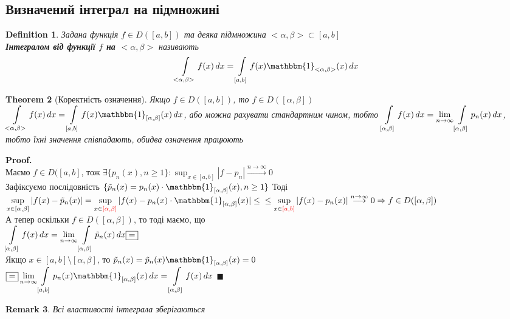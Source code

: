 \documentclass[a4paper, 14pt]{extarticle}
\def\huge{\displaystyle}
\def\bigline{\vspace{5mm}\\}
\theoremstyle{theoremdd}
\newtheorem{theorem}{Theorem}[subsection]
\theoremstyle{theoremdd}
\newtheorem{definition}[theorem]{Definition}
\theoremstyle{theoremdd}
\theoremstyle{theoremdd}
\theoremstyle{theoremdd}
\theoremstyle{theoremdd}
\newtheorem{remark}[theorem]{Remark}
\theoremstyle{theoremdd}
\theoremstyle{theoremdd}
\newenvironment{pf}{\vspace*{-3mm} \textbf{Proof. \\}}{$\blacksquare$}
\begin{document}
\subsection{Визначений інтеграл на підмножині}
\begin{definition}
Задана функція $f \in D([a,b])$ та деяка підмножина $<\alpha, \beta> \subset [a,b]$\\
\textbf{Інтегралом від функції $f$ на $<\alpha, \beta>$} називають
\begin{align*}
\int\displaylimits_{<\alpha, \beta>} f(x)\,dx = \int\displaylimits_{[a,b]} f(x) \mathbbm{1}_{<\alpha,\beta>}(x)\,dx
\end{align*}
\end{definition}

\begin{theorem}[Коректність означення]
Якщо $f \in D([a,b])$, то $f \in D([\alpha, \beta])$\\
$\huge \int\displaylimits_{<\alpha, \beta>} f(x)\,dx = \int\displaylimits_{[a,b]} f(x) \mathbbm{1}_{[\alpha,\beta]}(x)\,dx$, або можна рахувати стандартним чином, тобто $\huge \int\displaylimits_{[\alpha, \beta]} f(x)\,dx = \lim_{n \to \infty} \int\displaylimits_{[\alpha, \beta]} p_n(x)\,dx$, тобто їхні значення співпадають, обидва означення працюють
\end{theorem}

\begin{pf}
Маємо $f \in D([a,b]$, тож $\exists \{p_n(x), n \geq 1\}: \huge \sup_{x \in [a,b]} |f-p_n| \overset{n \to \infty}{\longrightarrow} 0$\\
Зафіксуємо послідовність $\{ \tilde{p}_n(x) = p_n(x) \cdot \mathbbm{1}_{[\alpha, \beta]}(x), n \geq 1 \}$
Тоді \\
$\huge \sup_{x \in [\alpha, \beta]} |f(x) - \tilde{p}_n(x)| = \sup_{x \in \textcolor{red}{[\alpha, \beta]}} |f(x) - p_n(x) \cdot \mathbbm{1}_{[\alpha, \beta]}(x)| \leq \\ \leq \sup_{x \in \textcolor{red}{[a, b]}} |f(x) - p_n(x)| \overset{n \to \infty}{\longrightarrow} 0 \Rightarrow f \in D([\alpha, \beta])$
\bigline
А тепер оскільки $f \in D([\alpha,\beta])$, то тоді маємо, що\\
$\huge \int\displaylimits_{[\alpha, \beta]} f(x)\,dx = \lim_{n \to \infty} \int\displaylimits_{[\alpha, \beta]} \tilde{p}_n(x)\,dx \boxed{=}$\\
Якщо $x \in [a,b] \setminus [\alpha, \beta]$, то $\tilde{p}_n(x) = \tilde{p}_n(x) \mathbbm{1}_{[\alpha, \beta]}(x) = 0$\\
$\boxed{=} \huge \lim_{n \to \infty} \int\displaylimits_{[a,b]} p_n(x) \mathbbm{1}_{[\alpha, \beta]} (x)\,dx = \int\displaylimits_{[\alpha, \beta]} f(x)\,dx$
\end{pf}
\\
\begin{remark}
Всі властивості інтеграла зберігаються
\end{remark}
\end{document}
